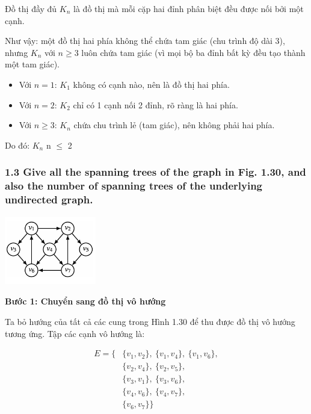 \documentclass{article}
\begin{document}
	Đồ thị đầy đủ \( K_n \) là đồ thị mà mỗi cặp hai đỉnh phân biệt đều được nối bởi một cạnh.
	
	Như vậy: một đồ thị hai phía không thể chứa tam giác (chu trình độ dài 3), nhưng \( K_n \) với \( n \geq 3 \) luôn chứa tam giác (vì mọi bộ ba đỉnh bất kỳ đều tạo thành một tam giác).
	
	\begin{itemize}
		\item Với \( n = 1 \): \( K_1 \) không có cạnh nào, nên là đồ thị hai phía.
		\item Với \( n = 2 \): \( K_2 \) chỉ có 1 cạnh nối 2 đỉnh, rõ ràng là hai phía.
		\item Với \( n \geq 3 \): \( K_n \) chứa chu trình lẻ (tam giác), nên không phải hai phía.
	\end{itemize}
	
	Do đó: $K_n$  n $\leq$ 2
	
	\subsubsection*{1.3 Give all the spanning trees of the graph in Fig. 1.30, and also the number of spanning trees of the underlying undirected graph.}
	
	\begin{center}
	\includegraphics[width=4cm, height=3cm]{Images/1_30.png}
	\end{center}
	
	\textbf{Bước 1: Chuyển sang đồ thị vô hướng}
	
	Ta bỏ hướng của tất cả các cung trong Hình 1.30 để thu được đồ thị vô hướng tương ứng. Tập các cạnh vô hướng là:
	
	\[
	\begin{aligned}
		E = \{ 
		& \{v_1, v_2\},\ \{v_1, v_4\},\ \{v_1, v_6\}, \\
		& \{v_2, v_4\},\ \{v_2, v_5\}, \\
		& \{v_3, v_1\},\ \{v_3, v_6\}, \\
		& \{v_4, v_6\},\ \{v_4, v_7\}, \\
		& \{v_6, v_7\} 
		\}
	\end{aligned}
	\]
	
\end{document}

